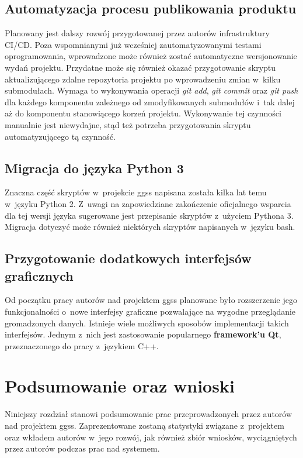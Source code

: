 \section{Automatyzacja procesu publikowania produktu}
Planowany jest dalszy rozwój przygotowanej przez autorów infrastruktury CI/CD. Poza wspomnianymi już wcześniej zautomatyzowanymi testami oprogramowania, wprowadzone może również zostać automatyczne wersjonowanie wydań projektu. Przydatne może się również okazać przygotowanie skryptu aktualizującego zdalne repozytoria projektu po wprowadzeniu zmian w~kilku submodułach. Wymaga to wykonywania operacji \textit{git add}, \textit{git commit} oraz \textit{git push} dla każdego komponentu zależnego od zmodyfikowanych submodułów i~tak dalej aż do komponentu stanowiącego korzeń projektu. Wykonywanie tej czynności manualnie jest niewydajne, stąd też potrzeba przygotowania skryptu automatyzującego tą czynność.


\section{Migracja do języka Python 3}
Znaczna część skryptów w~projekcie \gls*{ggss} napisana została kilka lat temu w~języku Python 2. Z~uwagi na zapowiedziane zakończenie oficjalnego wsparcia dla tej wersji języka sugerowane jest przepisanie skryptów z~użyciem Pythona 3. Migracja dotyczyć może również niektórych skryptów napisanych w~języku \gls*{bash}. 

\section{Przygotowanie dodatkowych interfejsów graficznych}
Od początku pracy autorów nad projektem \gls*{ggss} planowane było rozszerzenie jego funkcjonalności o~nowe interfejsy graficzne pozwalające na wygodne przeglądanie gromadzonych danych. Istnieje wiele możliwych sposobów implementacji takich interfejsów. Jednym z~nich jest zastosowanie popularnego \textbf{framework'u Qt}, przeznaczonego do pracy z~językiem C++. 


\chapter{Podsumowanie oraz wnioski}
\label{cha:summary}
Niniejszy rozdział stanowi podsumowanie prac przeprowadzonych przez autorów nad projektem \gls*{ggss}. Zaprezentowane zostaną statystyki związane z~projektem oraz wkładem autorów w~jego rozwój, jak również zbiór wniosków, wyciągniętych przez autorów podczas prac nad systemem. 

